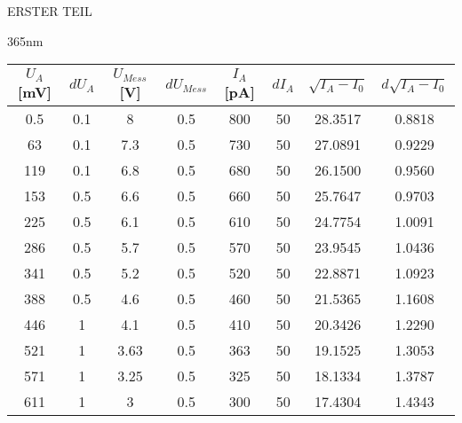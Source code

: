   \begin{appendix}
    \label{Anhang}
   
    
   
    \begin{chapter}{ERSTER TEIL}
      \label{Anhang:chp:ERSTERTEIL}
     
     
     
      \begin{section}{365nm}
        \label{Anhang:chp:ERSTERTEIL:sec:365}
        
        \begin{table}[htbp]
          \centering
          \scriptsize
          \begin{tabular}{|c|c|c|c|c|c|c|c|}
            \hline
            $U_{A}$ [mV] & $dU_{A}$ & $U_{Mess}$ [V] & $dU_{Mess}$ & 
                $I_{A}$ [pA] & $dI_{A}$ & $\sqrt{I_{A}-I_0}$ & 
                $d\sqrt{I_{A}-I_0}$ \\ \hline
            0.5 & 0.1 & 8 & 0.5 & 800 & 50 & 28.3517 & 0.8818 \\ \hline
            63 & 0.1 & 7.3 & 0.5 & 730 & 50 & 27.0891 & 0.9229 \\ \hline
            119 & 0.1 & 6.8 & 0.5 & 680 & 50 & 26.1500 & 0.9560 \\ \hline
            153 & 0.5 & 6.6 & 0.5 & 660 & 50 & 25.7647 & 0.9703 \\ \hline
            225 & 0.5 & 6.1 & 0.5 & 610 & 50 & 24.7754 & 1.0091 \\ \hline
            286 & 0.5 & 5.7 & 0.5 & 570 & 50 & 23.9545 & 1.0436 \\ \hline
            341 & 0.5 & 5.2 & 0.5 & 520 & 50 & 22.8871 & 1.0923 \\ \hline
            388 & 0.5 & 4.6 & 0.5 & 460 & 50 & 21.5365 & 1.1608 \\ \hline
            446 & 1 & 4.1 & 0.5 & 410 & 50 & 20.3426 & 1.2290 \\ \hline
            521 & 1 & 3.63 & 0.5 & 363 & 50 & 19.1525 & 1.3053 \\ \hline
            571 & 1 & 3.25 & 0.5 & 325 & 50 & 18.1334 & 1.3787 \\ \hline
            611 & 1 & 3 & 0.5 & 300 & 50 & 17.4304 & 1.4343 \\ \hline

\end{tabular}
\end{table}
\end{section}
\end{chapter}
\end{appendix}

